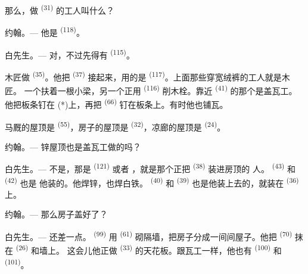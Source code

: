 那么，做 \textsuperscript{(31)} 的工人叫什么？

\textsc{约翰}。--- 他是 \textsuperscript{(118)}。

\VUsaut{3.0mm}
\VUsaut{3.0mm}

\textsc{白先生}。--- 对，不过先得有 \textsuperscript{(115)}。

木匠做 \textsuperscript{(35)}。他把 \textsuperscript{(37)} 接起来，用的是
 \textsuperscript{(117)}。上面那些穿宽绒裤的工人就是木匠。
一个扶着一根小梁，另一个正用 \textsuperscript{(116)} 削木栓。靠近
 \textsuperscript{(41)} 的那个是盖瓦工。他把板条钉在
(*)上，再把 \textsuperscript{(66)} 钉在板条上。有时他也铺瓦。


马厩的屋顶是 \textsuperscript{(55)}，房子的屋顶是
\textsuperscript{(32)}，凉廊的屋顶是 \textsuperscript{(24)}。

\textsc{约翰}。--- 锌屋顶也是盖瓦工做的吗？

\textsc{白先生}。--- 不是，那是 \textsuperscript{(121)} 或者
，就是那个正把 \textsuperscript{(38)} 装进房顶的
人。 \textsuperscript{(43)} 和 \textsuperscript{(42)} 也是
他装的。他焊锌，也焊白铁。 \textsuperscript{(40)} 和
 \textsuperscript{(39)} 也是他装上去的，就装在
\textsuperscript{(36)} 上。

\textsc{约翰}。--- 那么房子盖好了？

\VUsaut{3.0mm}
\VUsaut{3.0mm}

\textsc{白先生}。--- 还差一点。 \textsuperscript{(99)} 用
 \textsuperscript{(61)} 砌隔墙，把房子分成一间间屋子。他把 \textsuperscript{(70)} 抹在
 \textsuperscript{(26)} 和墙上。
这会儿他正做 \textsuperscript{(33)} 的天花板。跟瓦工一样，他也有
 \textsuperscript{(100)} 和 \textsuperscript{(101)}。

